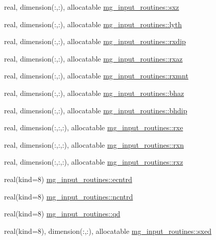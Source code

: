 \begin{DoxyCompactItemize}
\item 
real, dimension(\+:,\+:), allocatable \hyperlink{namespacemg__input__routines_a35d6682fe8d7519dcfe49b65584486ae}{mg\+\_\+input\+\_\+routines\+::sxz}
\item 
real, dimension(\+:,\+:), allocatable \hyperlink{namespacemg__input__routines_aa9693c554c4256fdbbe5ed5a0bc7976f}{mg\+\_\+input\+\_\+routines\+::lyth}
\item 
real, dimension(\+:,\+:), allocatable \hyperlink{namespacemg__input__routines_aed3ac6dc57c781768202d18f3d62890b}{mg\+\_\+input\+\_\+routines\+::rxdip}
\item 
real, dimension(\+:,\+:), allocatable \hyperlink{namespacemg__input__routines_aef064a6e032db7a3d58c0d1964e517ae}{mg\+\_\+input\+\_\+routines\+::rxaz}
\item 
real, dimension(\+:,\+:), allocatable \hyperlink{namespacemg__input__routines_a7e1fc78cde53c3fba57fb6843fdd754f}{mg\+\_\+input\+\_\+routines\+::rxmnt}
\item 
real, dimension(\+:,\+:), allocatable \hyperlink{namespacemg__input__routines_a028ce31030b8cbaac07934598f1bb0b3}{mg\+\_\+input\+\_\+routines\+::bhaz}
\item 
real, dimension(\+:,\+:), allocatable \hyperlink{namespacemg__input__routines_a2cf5a853bfa353bf9d25a57b6aac283a}{mg\+\_\+input\+\_\+routines\+::bhdip}
\item 
real, dimension(\+:,\+:,\+:), allocatable \hyperlink{namespacemg__input__routines_a107a688fa11bcfd8753c8250a50ba459}{mg\+\_\+input\+\_\+routines\+::rxe}
\item 
real, dimension(\+:,\+:,\+:), allocatable \hyperlink{namespacemg__input__routines_af8a2966f8b7dbe85319bd37e57631ae7}{mg\+\_\+input\+\_\+routines\+::rxn}
\item 
real, dimension(\+:,\+:,\+:), allocatable \hyperlink{namespacemg__input__routines_a97b256f49e649be206afebcd3ea97eb5}{mg\+\_\+input\+\_\+routines\+::rxz}
\item 
real(kind=8) \hyperlink{namespacemg__input__routines_aa1f05f7245fd87ee0872f3d87b6f5711}{mg\+\_\+input\+\_\+routines\+::ecntrd}
\item 
real(kind=8) \hyperlink{namespacemg__input__routines_a7a7ebfe0ae5724156d7e5a4bc92d1b7a}{mg\+\_\+input\+\_\+routines\+::ncntrd}
\item 
real(kind=8) \hyperlink{namespacemg__input__routines_a2209bb7dd2f702a500cff15b254ea118}{mg\+\_\+input\+\_\+routines\+::qd}
\item 
real(kind=8), dimension(\+:,\+:), allocatable \hyperlink{namespacemg__input__routines_a148ea345433a4a23b86d112f33055942}{mg\+\_\+input\+\_\+routines\+::sxed}

\end{DoxyCompactItemize}
